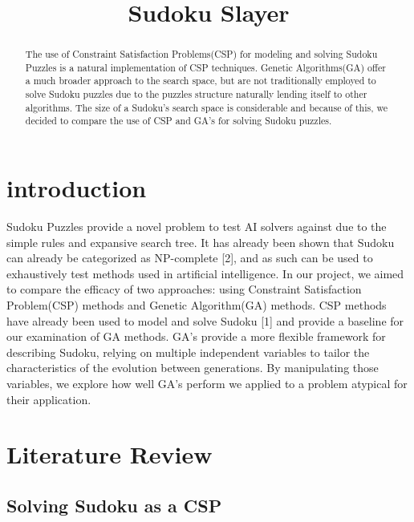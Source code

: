 \documentclass[12pt, conference]{IEEEtran}
\begin{document}
\title{Sudoku Slayer}

\author{
\and
{}
}

\maketitle

\begin{abstract}

The use of Constraint Satisfaction Problems(CSP) for modeling and solving Sudoku Puzzles is a natural implementation of CSP techniques.
Genetic Algorithms(GA) offer a much broader approach to the search space, but are not traditionally employed to solve Sudoku puzzles due to the puzzles structure naturally lending itself to other algorithms.
The size of a Sudoku's search space is considerable and because of this, we decided to compare the use of CSP and GA's for solving Sudoku puzzles.

\end{abstract}

\section{introduction}

Sudoku Puzzles provide a novel problem to test AI solvers against due to the simple rules and expansive search tree.
It has already been shown that Sudoku can already be categorized as NP-complete [2], and as such can be used to exhaustively test methods used in artificial intelligence.
In our project, we aimed to compare the efficacy of two approaches: using Constraint Satisfaction Problem(CSP) methods and Genetic Algorithm(GA) methods.
CSP methods have already been used to model and solve Sudoku [1] and provide a baseline for our examination of GA methods.
GA's provide a more flexible framework for describing Sudoku, relying on multiple independent variables to tailor the characteristics of the evolution between generations.
By manipulating those variables, we explore how well GA's perform we applied to a problem atypical for their application.

\section{Literature Review}

\subsection{Solving Sudoku as a CSP}
\end{document}
